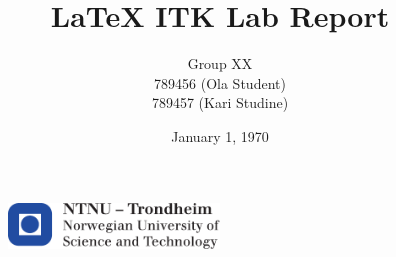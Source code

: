 \documentclass[11pt, a4paper, USenglish]{article} %
\title{LaTeX ITK Lab Report}
\author{Group XX\\789456 (Ola Student) \\789457 (Kari Studine)}
\date{January 1, 1970}
\begin{document}
\begin{titlepage}
    \maketitle
    \begin{figure}
    \centering
    \includegraphics[width=0.5\textwidth]{images/logontnu_eng}
    \end{figure}
    \thispagestyle{empty}
\end{titlepage}

\tableofcontents
\thispagestyle{empty} %
\newpage    

\setcounter{page}{1}





\newpage

\end{document}
